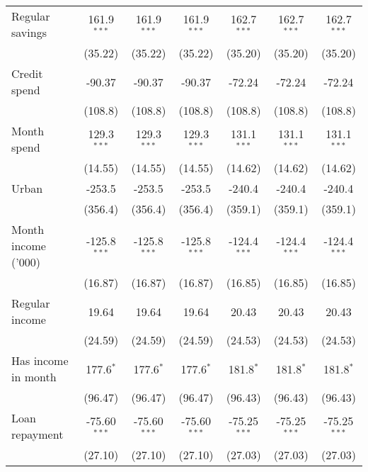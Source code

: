 \begin{table}[htbp]
\begin{footnotesize}
\begin{tabular}{lcccccc}
         Regular savings     & 161.9$^{***}$  & 161.9$^{***}$  & 161.9$^{***}$  & 162.7$^{***}$  & 162.7$^{***}$  & 162.7$^{***}$\\
                             & (35.22)        & (35.22)        & (35.22)        & (35.20)        & (35.20)        & (35.20)\\
         Credit spend        & -90.37         & -90.37         & -90.37         & -72.24         & -72.24         & -72.24\\
                             & (108.8)        & (108.8)        & (108.8)        & (108.8)        & (108.8)        & (108.8)\\
         Month spend         & 129.3$^{***}$  & 129.3$^{***}$  & 129.3$^{***}$  & 131.1$^{***}$  & 131.1$^{***}$  & 131.1$^{***}$\\
                             & (14.55)        & (14.55)        & (14.55)        & (14.62)        & (14.62)        & (14.62)\\
         Urban               & -253.5         & -253.5         & -253.5         & -240.4         & -240.4         & -240.4\\
                             & (356.4)        & (356.4)        & (356.4)        & (359.1)        & (359.1)        & (359.1)\\
         Month income ('000) & -125.8$^{***}$ & -125.8$^{***}$ & -125.8$^{***}$ & -124.4$^{***}$ & -124.4$^{***}$ & -124.4$^{***}$\\
                             & (16.87)        & (16.87)        & (16.87)        & (16.85)        & (16.85)        & (16.85)\\
         Regular income      & 19.64          & 19.64          & 19.64          & 20.43          & 20.43          & 20.43\\
                             & (24.59)        & (24.59)        & (24.59)        & (24.53)        & (24.53)        & (24.53)\\
         Has income in month & 177.6$^{*}$    & 177.6$^{*}$    & 177.6$^{*}$    & 181.8$^{*}$    & 181.8$^{*}$    & 181.8$^{*}$\\
                             & (96.47)        & (96.47)        & (96.47)        & (96.43)        & (96.43)        & (96.43)\\
         Loan repayment      & -75.60$^{***}$ & -75.60$^{***}$ & -75.60$^{***}$ & -75.25$^{***}$ & -75.25$^{***}$ & -75.25$^{***}$\\
                             & (27.10)        & (27.10)        & (27.10)        & (27.03)        & (27.03)        & (27.03)\\

\end{tabular}
\end{footnotesize}
\end{table}
